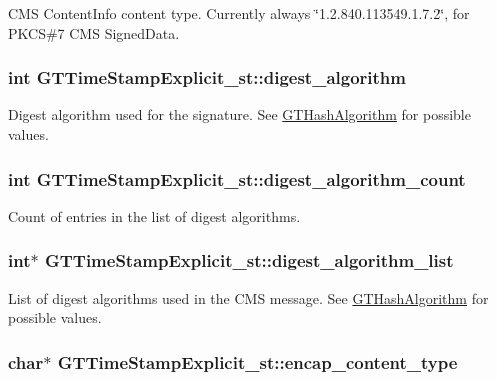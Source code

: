 \label{struct_g_t_time_stamp_explicit__st_aa7221ac65d21a1dd1748eac4707113e7}
CMS {\ttfamily ContentInfo} content type. Currently always \char`\"{}1.2.840.113549.1.7.2\char`\"{}, for PKCS\#7 CMS {\ttfamily SignedData}. \hypertarget{struct_g_t_time_stamp_explicit__st_a97614607045d391e6d58c3daa31c8538}{
\subsubsection[{digest\_\-algorithm}]{\setlength{\rightskip}{0pt plus 5cm}int {\bf GTTimeStampExplicit\_\-st::digest\_\-algorithm}}}
\label{struct_g_t_time_stamp_explicit__st_a97614607045d391e6d58c3daa31c8538}
Digest algorithm used for the signature. See \hyperlink{group__common_ga5110e02245c37b4ff48ea4c4efb2924a}{GTHashAlgorithm} for possible values. \hypertarget{struct_g_t_time_stamp_explicit__st_a0a2ec71de094aafb5cb8780fe05790cd}{
\subsubsection[{digest\_\-algorithm\_\-count}]{\setlength{\rightskip}{0pt plus 5cm}int {\bf GTTimeStampExplicit\_\-st::digest\_\-algorithm\_\-count}}}
\label{struct_g_t_time_stamp_explicit__st_a0a2ec71de094aafb5cb8780fe05790cd}
Count of entries in the list of digest algorithms. \hypertarget{struct_g_t_time_stamp_explicit__st_ae8ac2ea7cf54746c5ec94c6bd9332276}{
\subsubsection[{digest\_\-algorithm\_\-list}]{\setlength{\rightskip}{0pt plus 5cm}int$\ast$ {\bf GTTimeStampExplicit\_\-st::digest\_\-algorithm\_\-list}}}
\label{struct_g_t_time_stamp_explicit__st_ae8ac2ea7cf54746c5ec94c6bd9332276}
List of digest algorithms used in the CMS message. See \hyperlink{group__common_ga5110e02245c37b4ff48ea4c4efb2924a}{GTHashAlgorithm} for possible values. \hypertarget{struct_g_t_time_stamp_explicit__st_ac79a05fdadd73abab51336ae85191b52}{
\subsubsection[{encap\_\-content\_\-type}]{\setlength{\rightskip}{0pt plus 5cm}char$\ast$ {\bf GTTimeStampExplicit\_\-st::encap\_\-content\_\-type}}}
